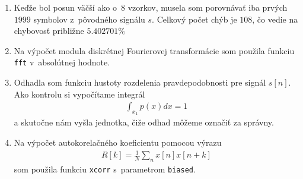 \documentclass[10pt, a4paper, twocolumn]{article}
\begin{document}
\begin{enumerate}[leftmargin=*]
\item Keďže bol posun väčší ako o~8 vzorkov, musela som porovnávať iba prvých $1999$ symbolov z~pôvodného signálu $s$. Celkový počet chýb je $108$, čo vedie na chybovosť približne $5.402701 \%$

\item Na výpočet modula diskrétnej Fourierovej transformácie som použila funkciu \texttt{fft} v~absolútnej hodnote.
\begin{figure}[H]
\centering
{}
\end{figure}

\item Odhadla som funkciu hustoty rozdelenia pravdepodobnosti pre signál $s[n]$. Ako kontrolu si vypočítame integrál
\begin{align}
\int_{x_1} p(x) dx = 1 \nonumber
\end{align}
a skutočne nám vyšla jednotka, čiže odhad môžeme označiť za správny.
\begin{figure}[H]
\centering
{}
\end{figure}

\item Na výpočet autokorelačného koeficientu pomocou výrazu 
\begin{align}
R[k] = \frac{1}{N}\sum\limits_n x[n]x[n+k]\nonumber
\end{align}
 som použila funkciu \texttt{xcorr} s~parametrom \texttt{biased}.
\begin{figure}[H]
\centering
{}
\end{figure}


\end{enumerate}
\end{document}
